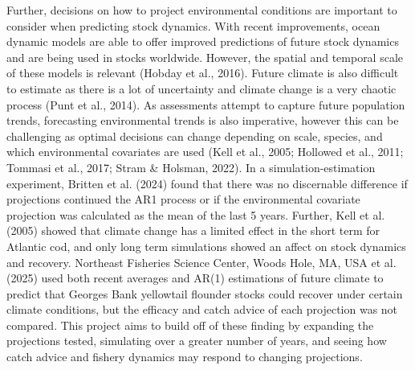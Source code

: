 \documentclass[
  12pt,
]{article}
\begin{document}
Further, decisions on how to project environmental conditions are important to consider when predicting stock dynamics. With recent improvements, ocean dynamic models are able to offer improved predictions of future stock dynamics and are being used in stocks worldwide. However, the spatial and temporal scale of these models is relevant (Hobday et al., 2016). Future climate is also difficult to estimate as there is a lot of uncertainty and climate change is a very chaotic process (Punt et al., 2014). As assessments attempt to capture future population trends, forecasting environmental trends is also imperative, however this can be challenging as optimal decisions can change depending on scale, species, and which environmental covariates are used (Kell et al., 2005; Hollowed et al., 2011; Tommasi et al., 2017; Stram \& Holsman, 2022). In a simulation-estimation experiment, Britten et al. (2024) found that there was no discernable difference if projections continued the AR1 process or if the environmental covariate projection was calculated as the mean of the last 5 years. Further, Kell et al. (2005) showed that climate change has a limited effect in the short term for Atlantic cod, and only long term simulations showed an affect on stock dynamics and recovery. Northeast Fisheries Science Center, Woods Hole, MA, USA et al. (2025) used both recent averages and AR(1) estimations of future climate to predict that Georges Bank yellowtail flounder stocks could recover under certain climate conditions, but the efficacy and catch advice of each projection was not compared. This project aims to build off of these finding by expanding the projections tested, simulating over a greater number of years, and seeing how catch advice and fishery dynamics may respond to changing projections.
\end{document}
